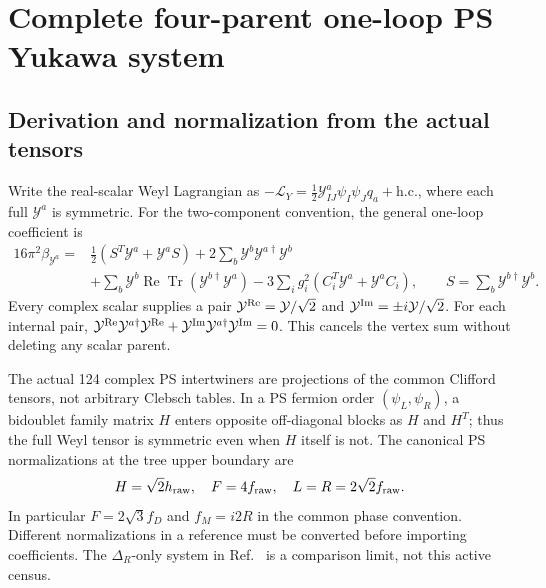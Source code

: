 \documentclass[11pt]{article}
\newcommand{\tr}{\operatorname{Tr}}
\begin{document}
\section{Complete four-parent one-loop PS Yukawa system}
\subsection{Derivation and normalization from the actual tensors}
Write the real-scalar Weyl Lagrangian as
$-\mathcal L_Y=\frac12\mathcal Y^a_{IJ}\psi_I\psi_J q_a+\mathrm{h.c.}$,
where each full $\mathcal Y^a$ is symmetric. For the two-component
convention, the general one-loop coefficient is \cite{LWX}
\begin{align}
16\pi^2\beta_{\mathcal Y^a}
={}&\tfrac12(S^T\mathcal Y^a+\mathcal Y^aS)
 +2\sum_b\mathcal Y^b\mathcal Y^{a\dagger}\mathcal Y^b\nonumber\\
&+\sum_b\mathcal Y^b\operatorname{Re}\tr(\mathcal Y^{b\dagger}\mathcal Y^a)
 -3\sum_i g_i^2(C_i^T\mathcal Y^a+\mathcal Y^a C_i),\qquad
 S=\sum_b\mathcal Y^{b\dagger}\mathcal Y^b.
\end{align}
Every complex scalar supplies a pair
$\mathcal Y^{\rm Re}=\mathcal Y/\sqrt2$ and
$\mathcal Y^{\rm Im}=\pm i\mathcal Y/\sqrt2$. For each internal pair,
$\mathcal Y^{\rm Re}\mathcal Y^{a\dagger}\mathcal Y^{\rm Re}
+\mathcal Y^{\rm Im}\mathcal Y^{a\dagger}\mathcal Y^{\rm Im}=0$.
This cancels the vertex sum without deleting any scalar parent.

The actual 124 complex PS intertwiners are projections of the common
Clifford tensors, not arbitrary Clebsch tables. In a PS fermion order
$(\psi_L,\psi_R)$, a bidoublet family matrix $H$ enters opposite off-diagonal
blocks as $H$ and $H^T$; thus the full Weyl tensor is symmetric even when
$H$ itself is not. The canonical PS normalizations at the tree upper
boundary are
\begin{equation}
H=\sqrt2h_{\rm raw},\quad F=4f_{\rm raw},\quad
L=R=2\sqrt2f_{\rm raw}.
\label{eq:PSboundary}
\end{equation}
In particular $F=2\sqrt3 f_D$ and $f_M=i2R$ in the common phase convention.
Different normalizations in a reference must be converted before importing
coefficients. The $\Delta_R$-only system in Ref.~\cite{MOR} is a comparison
limit, not this active census.
\end{document}
